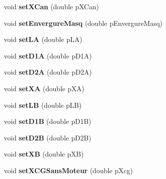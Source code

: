 \begin{DoxyCompactItemize}
void {\bfseries set\+X\+Can} (double p\+X\+Can)
\item 
\mbox{\label{classpackage_i_h_m_1_1_fusee_a438fc23f5f692504651ea9befd9d6080}} 
void {\bfseries set\+Envergure\+Masq} (double p\+Envergure\+Masq)
\item 
\mbox{\label{classpackage_i_h_m_1_1_fusee_ab1443ccbef6ceaf2d88b454422d1459f}} 
void {\bfseries set\+LA} (double p\+LA)
\item 
\mbox{\label{classpackage_i_h_m_1_1_fusee_a87b1a260185adb8cc4da48d4e7c21ab2}} 
void {\bfseries set\+D1A} (double p\+D1A)
\item 
\mbox{\label{classpackage_i_h_m_1_1_fusee_a9d8dbc7979eed99685708c96d0408e08}} 
void {\bfseries set\+D2A} (double p\+D2A)
\item 
\mbox{\label{classpackage_i_h_m_1_1_fusee_a8f1fbf01a5e2b23432bf3cb98a1472ae}} 
void {\bfseries set\+XA} (double p\+XA)
\item 
\mbox{\label{classpackage_i_h_m_1_1_fusee_ad118c4ee9278838ed86a9013f27f5209}} 
void {\bfseries set\+LB} (double p\+LB)
\item 
\mbox{\label{classpackage_i_h_m_1_1_fusee_aa323ec5a3bcfead8dbc544a134f7f5ff}} 
void {\bfseries set\+D1B} (double p\+D1B)
\item 
\mbox{\label{classpackage_i_h_m_1_1_fusee_a6d2626133415ca045afa4145cd13f7ae}} 
void {\bfseries set\+D2B} (double p\+D2B)
\item 
\mbox{\label{classpackage_i_h_m_1_1_fusee_a37a8b4800759957ee3285c7a44d44144}} 
void {\bfseries set\+XB} (double p\+XB)
\item 
\mbox{\label{classpackage_i_h_m_1_1_fusee_a6c5ff3b7e6ed0b2b60d505b1b412b644}} 
void {\bfseries set\+X\+C\+G\+Sans\+Moteur} (double p\+Xcg)
\item 
\mbox{\label{classpackage_i_h_m_1_1_fusee_afc93358b04fb82fbd0bd77b9d4cb176c}} 

\end{DoxyCompactItemize}
